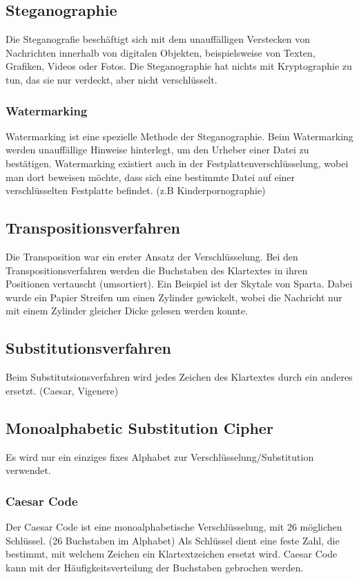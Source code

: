 \subsection{Steganographie}
Die Steganografie beschäftigt sich mit dem unauffälligen Verstecken von Nachrichten innerhalb von digitalen Objekten, beispielsweise von Texten, Grafiken, Videos oder Fotos. Die Steganographie hat nichts mit Kryptographie zu tun, das sie nur verdeckt, aber nicht verschlüsselt.

\subsubsection{Watermarking}
Watermarking ist eine spezielle Methode der Steganographie. Beim Watermarking werden unauffällige Hinweise hinterlegt, um den Urheber einer Datei zu bestätigen. Watermarking existiert auch in der Festplattenverschlüsselung, wobei man dort beweisen möchte, dass sich eine bestimmte Datei auf einer verschlüsselten Festplatte befindet. (z.B Kinderpornographie)

\subsection{Transpositionsverfahren}
Die Transposition war ein erster Ansatz der Verschlüsselung. Bei den Transpositionsverfahren werden die Buchstaben des Klartextes in ihren Positionen
vertauscht (umsortiert). Ein Beispiel ist der Skytale von Sparta. Dabei wurde ein Papier Streifen um einen Zylinder gewickelt, wobei die Nachricht nur mit einem Zylinder gleicher Dicke gelesen werden konnte.

\subsection{Substitutionsverfahren}
Beim Substitutsionsverfahren wird jedes Zeichen des Klartextes durch ein anderes ersetzt. (Caesar, Vigenere)

\subsection{Monoalphabetic Substitution Cipher}
Es wird nur ein einziges fixes Alphabet zur Verschlüsselung/Substitution verwendet.

\subsubsection{Caesar Code}
Der Caesar Code ist eine monoalphabetische Verschlüsselung, mit $26$ möglichen Schlüssel. (26 Buchstaben im Alphabet) Als Schlüssel dient eine feste Zahl, die bestimmt, mit welchem Zeichen ein Klartextzeichen ersetzt wird. Caesar Code kann mit der Häufigkeitsverteilung der Buchstaben gebrochen werden. 

